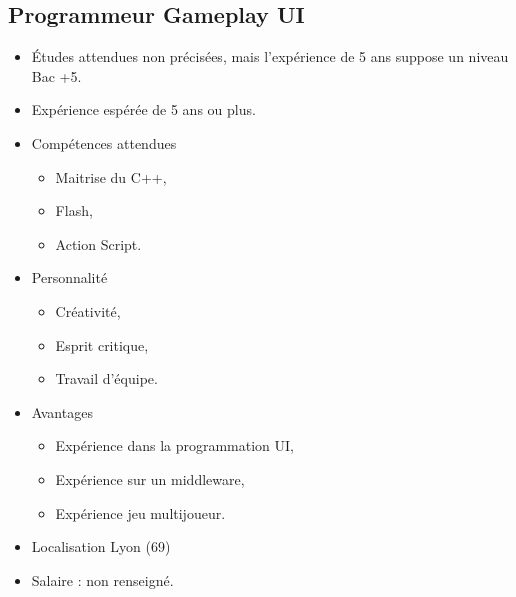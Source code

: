 \documentclass[12pt, a4paper]{report} %
\begin{document}
\subsection{Programmeur Gameplay UI}
\begin{itemize}
\item Études attendues non précisées, mais l'expérience de 5 ans suppose un niveau Bac +5.
\item Expérience espérée de 5 ans ou plus.
\item Compétences attendues  
  \begin{itemize}
    \item  Maitrise du C++,
    \item  Flash,
    \item  Action Script.
  \end{itemize}
\item Personnalité 
  \begin{itemize}
    \item Créativité,
    \item Esprit critique,
    \item Travail d'équipe.
  \end{itemize}
\item Avantages 
  \begin{itemize}
    \item Expérience dans la programmation UI,
    \item Expérience sur un middleware,
    \item Expérience jeu multijoueur.
  \end{itemize}
\item Localisation  Lyon (69)
\item Salaire : non renseigné.
\end{itemize}
\end{document}
